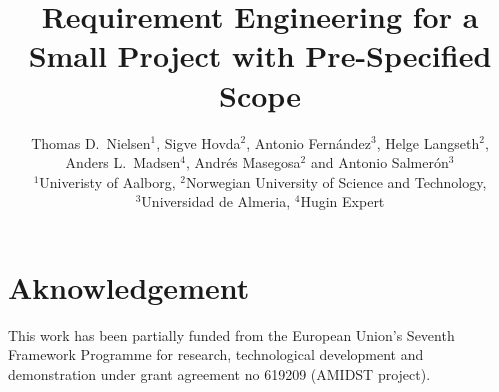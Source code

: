 \documentclass[ukenglish]{nik}
\title{Requirement Engineering for a Small Project with Pre-Specified Scope}
\author{Thomas D.\ Nielsen$^{1}$, Sigve Hovda$^{2}$, Antonio Fern\'andez$^{3}$, Helge Langseth$^{2}$, \\
Anders L.\ Madsen$^{4}$, Andr\'es Masegosa$^{2}$ and  Antonio Salmer\'on$^{3}$ \\
\normalsize $^{1}$Univeristy of Aalborg, $^{2}$Norwegian University of Science and Technology, 
\\
\normalsize $^{3}$Universidad de Almeria, $^{4}$Hugin Expert}
\begin{document}
\maketitle

\begin{abstract}

\end{abstract}











\section*{Aknowledgement}
This work has been partially funded from the European Union's Seventh Framework Programme for research, technological development and demonstration under grant agreement no 619209 (AMIDST project).  



\end{document}
